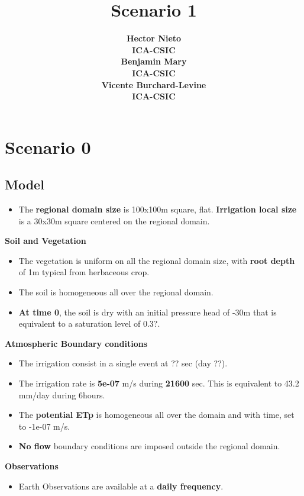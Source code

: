\documentclass{article}
\title{Scenario 1}
\date{\displaydate{articleDate}}
\author{\bfseries Hector Nieto\mdseries\\ICA-CSIC\\\AND\bfseries Benjamin Mary\mdseries\\ICA-CSIC\\\AND\bfseries Vicente Burchard-Levine\mdseries\\ICA-CSIC\\}
\begin{document}
\maketitle
{}

\section{Scenario 0}

\subsection{Model}

\begin{itemize}
\item The \textbf{regional domain size} is 100x100m square, flat. \textbf{Irrigation local size} is a 30x30m square centered on the regional domain.
\end{itemize}

\textbf{Soil and Vegetation}

\begin{itemize}
\item The vegetation is uniform on all the regional domain size, with \textbf{root depth} of 1m typical from herbaceous crop.
\item The soil is homogeneous all over the regional domain.
\item \textbf{At time 0}, the soil is dry with an initial pressure head of -30m that is equivalent to a saturation level of 0.3?.
\end{itemize}

\textbf{Atmospheric Boundary conditions}

\begin{itemize}
\item The irrigation consist in a single event at ?? sec (day ??).
\item The irrigation rate is \textbf{5e-07} m/s during \textbf{21600} sec. This is equivalent to 43.2 mm/day during 6hours.
\item The \textbf{potential ETp} is homogeneous all over the domain and with time, set to -1e-07 m/s.
\item \textbf{No flow} boundary conditions are imposed outside the regional domain.
\end{itemize}

\textbf{Observations}

\begin{itemize}
\item Earth Observations are available at a \textbf{daily frequency}.
\end{itemize}
\end{document}
